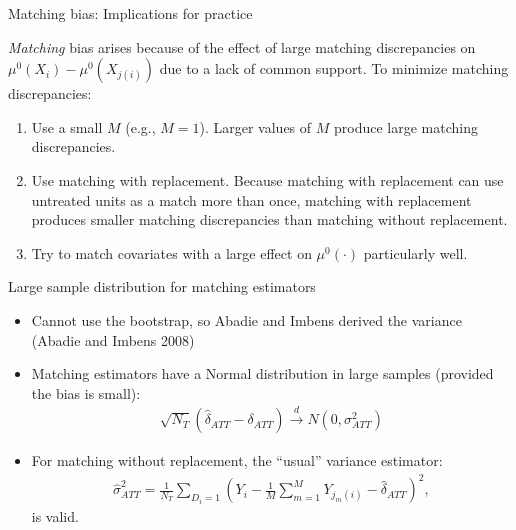 \documentclass{beamer}
\begin{document}
\begin{frame}{Matching bias: Implications for practice}
	
\emph{Matching} bias arises because of the effect of large matching discrepancies on $\mu^0(X_i) - \mu^0(X_{j(i)})$ due to a lack of common support. To minimize matching discrepancies:
	\begin{enumerate}
	\item Use a small $M$ (e.g., $M=1$). Larger values of $M$ produce large matching discrepancies.
	\item Use matching with replacement.  Because matching with replacement can use untreated units as a match more than once, matching with replacement produces smaller matching discrepancies than matching without replacement.
	\item Try to match covariates with a large effect on $\mu^0(\cdot)$ particularly well.
	\end{enumerate}
\end{frame}

\begin{frame}{Large sample distribution for matching estimators}
	
	\begin{itemize}
	\item Cannot use the bootstrap, so Abadie and Imbens derived the variance (Abadie and Imbens 2008)
	\item Matching estimators have a Normal distribution in large samples (provided the bias is small):
		\begin{eqnarray*}
		\sqrt{N_T} (\widehat{\delta}_{ATT} - \delta_{ATT}) \xrightarrow{d} N(0,\sigma^2_{ATT})
		\end{eqnarray*}
	\item For matching without replacement, the ``usual'' variance estimator:
		\begin{eqnarray*}
		\widehat{\sigma}^2_{ATT} = \frac{1}{N_T} \sum_{D_i=1} \left( Y_i - \frac{1}{M} \sum_{m=1}^M Y_{j_m(i)} - \widehat{\delta}_{ATT} \right)^2,
		\end{eqnarray*}is valid.
	\end{itemize}
\end{frame}
\end{document}
